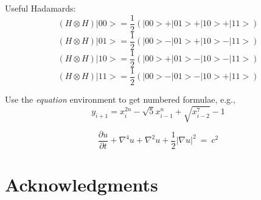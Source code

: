 \documentclass[12pt]{article}
\begin{document}
Useful Hadamards:
\begin{equation}
	(H\otimes H) |00> = \frac{1}{2}(|00> + |01> + |10> + |11>)
\end{equation}
\begin{equation}
	(H\otimes H) |01> = \frac{1}{2}(|00> - |01> + |10> - |11>)
\end{equation}
\begin{equation}
	(H\otimes H) |10> = \frac{1}{2}(|00> + |01> - |10> - |11>)
\end{equation}
\begin{equation}
	(H\otimes H) |11> = \frac{1}{2}(|00> - |01> - |10> + |11>)
\end{equation}

Use the \emph{equation} environment to get numbered formulae, e.g.,
\begin{equation}
	y_{i+1} = x_{i}^{2n} - \sqrt{5}x_{i-1}^{n} + \sqrt{x_{i-2}^7} -1
\end{equation}

\begin{equation}
	\frac{\partial u}{\partial t} + \nabla^{4}u + \nabla^{2}u +
        \frac12    |\nabla u|^{2}~ =~ c^2
\end{equation}

\section{Acknowledgments}
\end{document}
